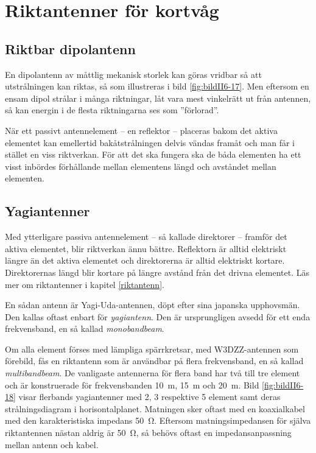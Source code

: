 \section{Riktantenner för kortvåg}

\subsection{Riktbar dipolantenn}


En dipolantenn av måttlig mekanisk storlek kan göras vridbar så att
utstrålningen kan riktas, så som illustreras i bild \ref{fig:bildII6-17}.
Men eftersom en ensam dipol strålar i många riktningar, låt vara mest vinkelrätt
ut från antennen, så kan energin i de flesta riktningarna ses som ''förlorad''.

När ett passivt antennelement -- en reflektor -- placeras bakom det aktiva
elementet kan emellertid bakåtstrålningen delvis vändas framåt och man får i
stället en viss riktverkan.
För att det ska fungera ska de båda elementen ha ett visst inbördes förhållande
mellan elementens längd och avståndet mellan elementen.


\subsection{Yagiantenner}


Med ytterligare passiva antennelement -- så kallade direktorer -- framför det
aktiva elementet, blir riktverkan ännu bättre.
Reflektorn är alltid elektriskt längre än det aktiva elementet och direktorerna
är alltid elektriskt kortare.
Direktorernas längd blir kortare på längre avstånd från det drivna elementet.
Läs mer om riktantenner i kapitel \ref{riktantenn}.

En sådan antenn är Yagi-Uda-antennen, döpt efter sina japanska upphovsmän.
Den kallas oftast enbart för \emph{yagiantenn}.
Den är ursprungligen avsedd för ett enda frekvensband, en så kallad
\emph{monobandbeam}.

Om alla element förses med lämpliga spärrkretsar, med W3DZZ-antennen som
förebild, fås en riktantenn som är användbar på flera frekvensband, en så
kallad \emph{multibandbeam}.
De vanligaste antennerna för flera band har två till tre element och är
konstruerade för frekvensbanden \SI{10}{\metre}, \SI{15}{\metre} och
\SI{20}{\metre}.
Bild \ref{fig:bildII6-18} visar flerbands yagiantenner med 2, 3 respektive 5
element samt deras strålningsdiagram i horisontalplanet.
Matningen sker oftast med en koaxialkabel med den karakteristiska impedans
\SI{50}{\ohm}.
Eftersom matningsimpedansen för själva riktantennen nästan aldrig är
\SI{50}{\ohm}, så behövs oftast en impedansanpassning mellan antenn och kabel.

